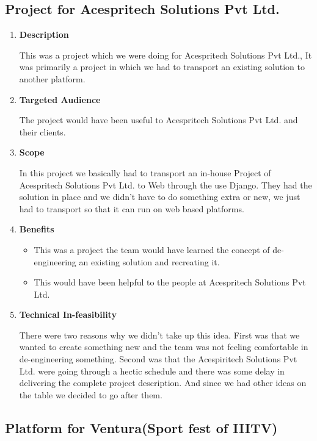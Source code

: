 \documentclass[fleqn,10pt]{../SelfArx} %
\begin{document}
\subsection {Project for Acespritech Solutions Pvt Ltd.}

\vspace{0.5cm}
\begin{enumerate}
\item \textbf{Description}

This was a project which we were doing for Acespritech Solutions Pvt Ltd., It was primarily a project in which we had to transport an existing solution to another platform. 

\item \textbf{Targeted Audience}

The project would have been useful to Acespritech Solutions Pvt Ltd. and their clients.

\item \textbf{Scope}

In this project we basically had to transport an in-house Project of Acespritech Solutions Pvt Ltd. to Web through the use Django. They had the solution in place and we didn't have to do something extra or new, we just had to transport so that it can run on web based platforms.

\item \textbf{Benefits}

\begin{itemize}
    \item	This was a project the team would have learned the concept of de-engineering an existing solution and recreating it.
  \item		This would have been helpful to the people at Acespritech Solutions Pvt Ltd.
\end{itemize}

\item \textbf{Technical  In-feasibility}

There were two reasons why we didn't take up this idea. First was that we wanted to create something new and the team was not feeling comfortable in de-engineering something. Second was that the Acespiritech Solutions Pvt Ltd. were going through a hectic schedule and there was some delay in delivering the complete project description. And since we had other ideas on the table we decided to go after them.
\end{enumerate}

\subsection {Platform for Ventura(Sport fest of IIITV)}
\end{document}
